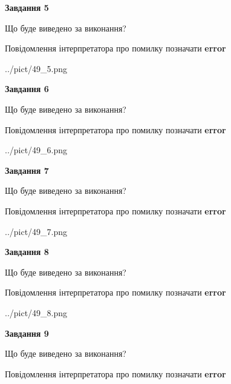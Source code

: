 \documentclass[11pt, ukrainian]{article}
\begin{document}
{\begin {large}
{\begin {center}\textbf{Завдання 5}\end {center}}\par
Що буде виведено за виконання? \par
Повідомлення інтерпретатора про помилку позначати \textbf{error}

\begin{center}
	{../pict/49_5.png}
\end{center}
\newpage

{\begin {center}\textbf{Завдання 6}\end {center}}\par
Що буде виведено за виконання? \par
Повідомлення інтерпретатора про помилку позначати \textbf{error}

\begin{center}
	{../pict/49_6.png}
\end{center}
\newpage

{\begin {center}\textbf{Завдання 7}\end {center}}\par
Що буде виведено за виконання? \par
Повідомлення інтерпретатора про помилку позначати \textbf{error}

\begin{center}
	{../pict/49_7.png}
\end{center}
\newpage

{\begin {center}\textbf{Завдання 8}\end {center}}\par
Що буде виведено за виконання? \par
Повідомлення інтерпретатора про помилку позначати \textbf{error}

\begin{center}
	{../pict/49_8.png}
\end{center}
\newpage

{\begin {center}\textbf{Завдання 9}\end {center}}\par
Що буде виведено за виконання? \par
Повідомлення інтерпретатора про помилку позначати \textbf{error}


\end{large}}
\end{document}
